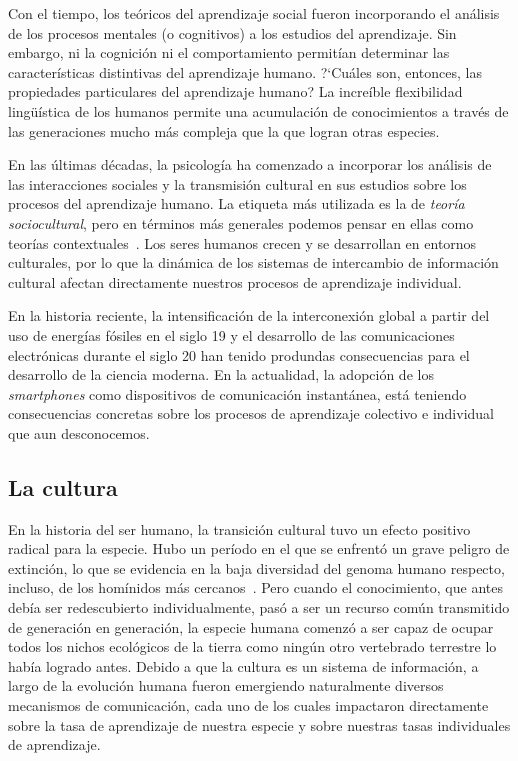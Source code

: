 \documentclass[a4paper,11pt]{book}
\theoremstyle{definition}
\begin{document}

Con el tiempo, los te\'oricos del aprendizaje social fueron incorporando el an\'alisis de los procesos mentales (o cognitivos) a los estudios del aprendizaje.
%
Sin embargo, ni la cognici\'on ni el comportamiento permit\'ian determinar las caracter\'isticas distintivas del aprendizaje humano.
%
?`Cu\'ales son, entonces, las propiedades particulares del aprendizaje humano?
%
La incre\'ible flexibilidad ling\"u\'istica de los humanos permite una acumulaci\'on de conocimientos a trav\'es de las generaciones mucho m\'as compleja que la que logran otras especies.


En las \'ultimas d\'ecadas, la psicolog\'ia ha comenzado a incorporar los an\'alisis de las interacciones sociales y la transmisi\'on cultural en sus estudios sobre los procesos del aprendizaje humano.
%
La etiqueta m\'as utilizada es la de \emph{teor\'ia sociocultural}, pero en t\'erminos m\'as generales podemos pensar en ellas como teor\'ias contextuales~\cite{Ormrod2017}.
%
Los seres humanos crecen y se desarrollan en entornos culturales, por lo que la din\'amica de los sistemas de intercambio de informaci\'on cultural afectan directamente nuestros procesos de aprendizaje individual.


En la historia reciente, la intensificaci\'on de la interconexi\'on global a partir del uso de energ\'ias f\'osiles en el siglo 19 y el desarrollo de las comunicaciones electr\'onicas durante el siglo 20 han tenido produndas consecuencias para el desarrollo de la ciencia moderna.
%
En la actualidad, la adopci\'on de los \emph{smartphones} como dispositivos de comunicaci\'on instant\'anea, est\'a teniendo consecuencias concretas sobre los procesos de aprendizaje colectivo e individual que aun desconocemos.

\subsection{La cultura}

En la historia del ser humano, la transici\'on cultural tuvo un efecto positivo radical para la especie.
%
Hubo un per\'iodo en el que se enfrent\'o un grave peligro de extinci\'on, lo que se evidencia en la baja diversidad del genoma humano respecto, incluso, de los hom\'inidos m\'as cercanos~\cite{Hrdy2009}.
%
Pero cuando el conocimiento, que antes deb\'ia ser redescubierto individualmente, pas\'o a ser un recurso com\'un transmitido de generaci\'on en generaci\'on, la especie humana comenz\'o a ser capaz de ocupar todos los nichos ecol\'ogicos de la tierra como ning\'un otro vertebrado terrestre lo hab\'ia logrado antes.
%
Debido a que la cultura es un sistema de informaci\'on, a largo de la evoluci\'on humana fueron emergiendo naturalmente diversos mecanismos de comunicaci\'on, cada uno de los cuales impactaron directamente sobre la tasa de aprendizaje de nuestra especie y sobre nuestras tasas individuales de aprendizaje.
\end{document}

